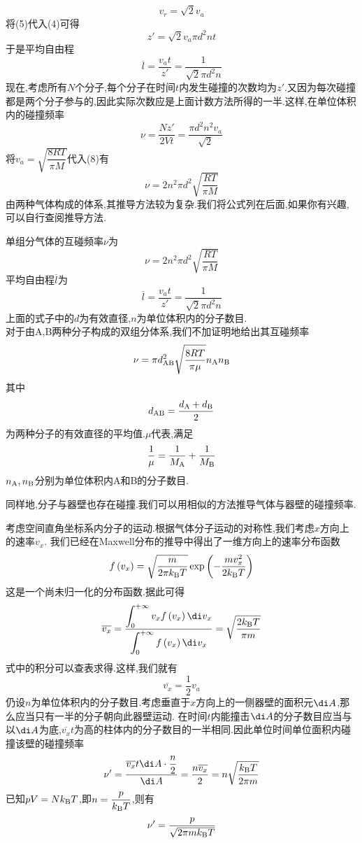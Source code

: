 \documentclass{ctexart}
\begin{document}
\begin{derivation}
\begin{equation}
        v_r=\sqrt{2}v_a
    \end{equation}
    将(5)代入(4)可得
    \begin{equation}
        z'=\sqrt2v_a\pi d^2nt
    \end{equation}
    于是平均自由程
    \begin{equation}
        \overline{l}=\dfrac{v_at}{z'}=\dfrac{1}{\sqrt2\pi d^2n}
    \end{equation}
    现在,考虑所有$N$个分子,每个分子在时间$t$内发生碰撞的次数均为$z'$.又因为每次碰撞都是两个分子参与的,因此实际次数应是上面计数方法所得的一半.这样,在单位体积内的碰撞频率
    \begin{equation}
        \nu=\dfrac{Nz'}{2Vt}=\dfrac{\pi d^2n^2v_a}{\sqrt2}
    \end{equation}
    将$v_a=\sqrt{\dfrac{8RT}{\pi M}}$代入(8)有
    \begin{equation}
        \nu=2n^2\pi d^2\sqrt{\dfrac{RT}{\pi M}}
    \end{equation}
    由两种气体构成的体系,其推导方法较为复杂.我们将公式列在后面,如果你有兴趣,可以自行查阅推导方法.
\end{derivation}\setcounter{equation}{0}
\begin{theorem}[1B.4.3 气体分子的互碰频率与平均自由程]
    单组分气体的互碰频率$\nu$为
    \[\nu=2n^2\pi d^2\sqrt{\dfrac{RT}{\pi M}}\]
    平均自由程$\overline{l}$为
    \[\overline{l}=\dfrac{v_at}{z'}=\dfrac{1}{\sqrt2\pi d^2n}\]
    上面的式子中的$d$为有效直径,$n$为单位体积内的分子数目.\\
    对于由A,B两种分子构成的双组分体系,我们不加证明地给出其互碰频率
    \[\nu=\pi d_{\text{AB}}^2\sqrt{\dfrac{8RT}{\pi\mu}}n_\text An_\text B\]
    其中
    \[d_{\text{AB}}=\dfrac{d_\text A+d_\text B}{2}\]
    为两种分子的有效直径的平均值.$\mu$代表,满足
    \[\dfrac1\mu=\dfrac{1}{M_\text A}+\dfrac{1}{M_\text B}\]
    $n_\text A,n_\text B$分别为单位体积内A和B的分子数目.
\end{theorem}
同样地,分子与器壁也存在碰撞.我们可以用相似的方法推导气体与器壁的碰撞频率.
\begin{derivation}
    考虑空间直角坐标系内分子的运动.根据气体分子运动的对称性,我们考虑$x$方向上的速率$v_x$.%
    我们已经在Maxwell分布的推导中得出了一维方向上的速率分布函数
    \[f\left(v_x\right)=\sqrt{\dfrac{m}{2\pi k_\text BT}}\exp\left(-\dfrac{mv_x^2}{2k_\text BT}\right)\]
    这是一个尚未归一化的分布函数.据此可得
    \[\overline{v_x}=\dfrac{\displaystyle\int_0^{+\infty}v_xf\left(v_x\right)\di v_x}{\displaystyle\int_0^{+\infty}f\left(v_x\right)\di v_x}=\sqrt{\dfrac{2k_\text BT}{\pi m}}\]
    式中的积分可以查表求得.这样,我们就有
    \[\overline{v_x}=\dfrac12v_a\]
    仍设$n$为单位体积内的分子数目.考虑垂直于$x$方向上的一侧器壁的面积元$\di A$,那么应当只有一半的分子朝向此器壁运动.%
    在时间$t$内能撞击$\di A$的分子数目应当与以$\di A$为底,$\overline{v_x}t$为高的柱体内的分子数目的一半相同.因此单位时间单位面积内碰撞该壁的碰撞频率
    \[\nu'=\dfrac{\overline{v_x}t\di A\cdot\dfrac n2}{\di A}=\dfrac{n\overline{v_x}}{2}=n\sqrt{\dfrac{k_\text BT}{2\pi m}}\]
    已知$pV=Nk_\text BT$,即$n=\dfrac{p}{k_\text BT}$,则有
    \[\nu'=\dfrac{p}{\sqrt{2\pi mk_\text BT}}\]
\end{derivation}
\end{document}
